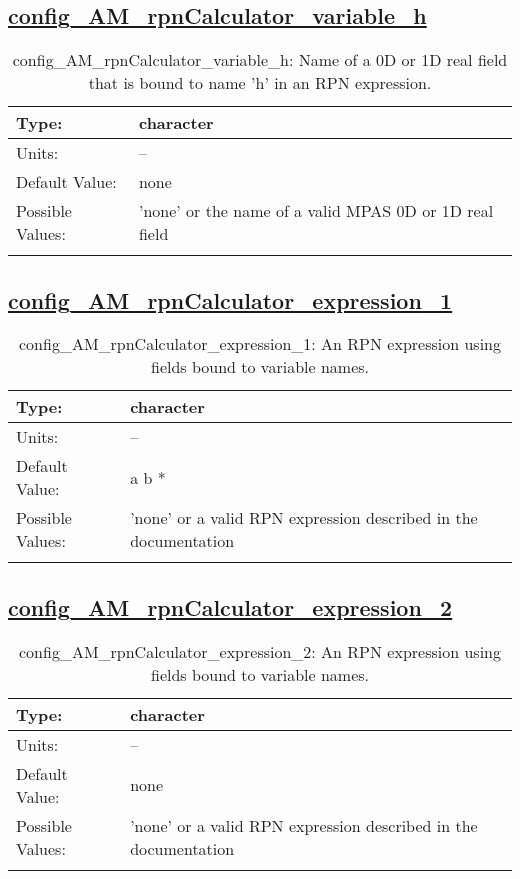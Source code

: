 \subsection[config\_AM\_rpnCalculator\_variable\_h]{\hyperref[sec:nm_tab_AM_rpnCalculator]{config\_AM\_rpnCalculator\_variable\_h}}
\label{subsec:nm_sec_config_AM_rpnCalculator_variable_h}
\begin{center}
\begin{longtable}{| p{2.0in} || p{4.0in} |}
    \hline
    Type: & character \\
    \hline
    Units: & -- \\
    \hline
    Default Value: & none \\
    \hline
    Possible Values: & 'none' or the name of a valid MPAS 0D or 1D real field \\
    \hline
    \caption{config\_AM\_rpnCalculator\_variable\_h: Name of a 0D or 1D real field that is bound to name 'h' in an RPN expression.}
\end{longtable}
\end{center}
\subsection[config\_AM\_rpnCalculator\_expression\_1]{\hyperref[sec:nm_tab_AM_rpnCalculator]{config\_AM\_rpnCalculator\_expression\_1}}
\label{subsec:nm_sec_config_AM_rpnCalculator_expression_1}
\begin{center}
\begin{longtable}{| p{2.0in} || p{4.0in} |}
    \hline
    Type: & character \\
    \hline
    Units: & -- \\
    \hline
    Default Value: & a b * \\
    \hline
    Possible Values: & 'none' or a valid RPN expression described in the documentation \\
    \hline
    \caption{config\_AM\_rpnCalculator\_expression\_1: An RPN expression using fields bound to variable names.}
\end{longtable}
\end{center}
\subsection[config\_AM\_rpnCalculator\_expression\_2]{\hyperref[sec:nm_tab_AM_rpnCalculator]{config\_AM\_rpnCalculator\_expression\_2}}
\label{subsec:nm_sec_config_AM_rpnCalculator_expression_2}
\begin{center}
\begin{longtable}{| p{2.0in} || p{4.0in} |}
    \hline
    Type: & character \\
    \hline
    Units: & -- \\
    \hline
    Default Value: & none \\
    \hline
    Possible Values: & 'none' or a valid RPN expression described in the documentation \\
    \hline
    \caption{config\_AM\_rpnCalculator\_expression\_2: An RPN expression using fields bound to variable names.}
\end{longtable}
\end{center}
